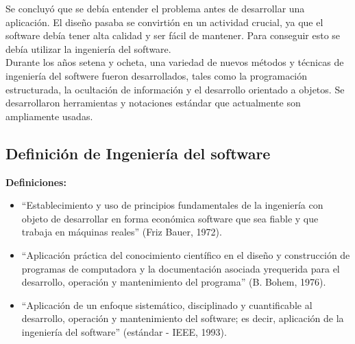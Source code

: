 \documentclass{article}
\begin{document}
Se concluyó que se debía entender el problema antes de desarrollar una aplicación. El diseño pasaba se convirtión en un actividad crucial, ya que el software debía tener alta calidad y ser fácil de mantener. Para conseguir esto se debía utilizar la ingeniería del software. \\

Durante los años setena y ocheta, una variedad de nuevos métodos y técnicas de ingeniería del softwere fueron desarrollados, tales como la programación estructurada, la ocultación de información y el desarrollo orientado a objetos. Se desarrollaron herramientas y notaciones estándar que actualmente son ampliamente usadas.

\subsection{Definición de Ingeniería del software}
\textbf{Definiciones:}

\begin{itemize}
\item ``Establecimiento y uso de principios fundamentales de la ingeniería con objeto de desarrollar en forma económica software que sea fiable y que trabaja en máquinas reales'' (Friz Bauer, 1972).

\item ``Aplicación práctica del conocimiento científico en el diseño y construcción de programas de computadora y la documentación asociada yrequerida para el desarrollo, operación y mantenimiento del programa'' (B. Bohem, 1976).

\item ``Aplicación de un enfoque sistemático, disciplinado y cuantificable al desarrollo, operación y mantenimiento del software; es decir, aplicación de la ingeniería del software'' (estándar - IEEE, 1993).
\end{itemize}
\end{document}
